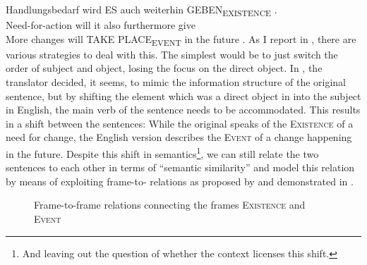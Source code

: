 \documentclass[output=paper]{LSP/langsci}
\begin{document}
\ea\label{czulo:ex:8}
\gll Handlungsbedarf wird ES auch weiterhin GEBEN\textsubscript{EXISTENCE} . \\
Need-for-action will it also furthermore give \\
\glt More changes will TAKE PLACE\textsubscript{EVENT} in the future .
\z
As I report in \citet{Culo2016}, there are various strategies to deal with this. The simplest would be to just switch the order of subject and object, losing the focus on the direct object. In , the translator decided, it seems, to mimic the information structure of the original sentence, but by shifting the element which was a direct object in  into the subject in English, the main verb of the sentence needs to be accommodated. This results in a  shift between the sentences: While the  original speaks of the \textsc{Existence} of a need for change, the English version describes the \textsc{Event} of a change happening in the future. Despite this shift in semantics\footnote{And leaving out the question of whether the context licenses this shift.}, we can still relate the two sentences to each other in terms of ``semantic similarity'' and model this relation by means of exploiting frame-to- relations as proposed by \citet{Ellsworth2006} and demonstrated in .


\begin{figure}
 \caption{Frame-to-frame relations connecting the frames \textsc{Existence} and \textsc{Event}}
 \label{czulo:fig:1}
\end{figure}
\end{document}
